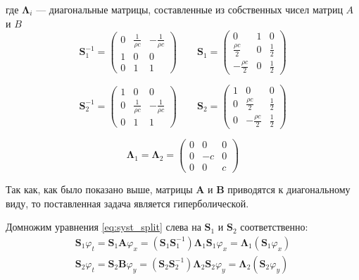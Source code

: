 где  $\pmb{\Lambda}_i$ --- диагональные матрицы, составленные из собственных чисел матриц $A$ и $B$
\begin{equation}
	\pmb{S}_1^{-1} = 
	\begin{pmatrix}
		0 & \frac{1}{\rho c} & -\frac{1}{\rho c} \\
		1 & 0 & 0 \\
		0 & 1 & 1			
    \end{pmatrix} \qquad
	\pmb{S}_1 = 
	\begin{pmatrix}
		0 & 1 & 0 \\
		\frac{\rho c}{2} & 0 & \frac{1}{2} \\
		-\frac{\rho c}{2} & 0 & \frac{1}{2}		
 	 \end{pmatrix}
\end{equation}

\begin{equation}
	\pmb{S}_2^{-1} = 
	\begin{pmatrix}
		1 & 0 & 0 \\
		0 & \frac{1}{\rho c} & -\frac{1}{\rho c} \\
		0 & 1 & 1			
 	\end{pmatrix} \qquad
	\pmb{S}_2 = 
	\begin{pmatrix}
		1 & 0 & 0 \\
		0 & \frac{\rho c}{2} & \frac{1}{2} \\
		0 & -\frac{\rho c}{2} & \frac{1}{2}	
 	\end{pmatrix}
\end{equation}

\begin{equation}
	\pmb{\Lambda}_1 = \pmb{\Lambda}_2 = 
	\begin{pmatrix}
		0 & 0 & 0 \\
		0 & -c & 0 \\
		0 & 0 & c				
	\end{pmatrix}
\end{equation}

Так как, как было показано выше, матрицы $\pmb{A}$ и $\pmb{B}$ приводятся к диагональному виду, то поставленная задача является гиперболической.

Домножим уравнения \eqref{eq:syst_split} слева на $\pmb{S}_1$ и $\pmb{S}_2$ соответственно:
\begin{equation}
\begin{gathered} 
	\pmb{S}_1\varphi_t = 
	\pmb{S}_1 \pmb{A} \varphi_x =
	\left(\pmb{S}_1 \pmb{S}_1^{-1}\right)\pmb{\Lambda}_1 \pmb{S}_1 \varphi_x =
	\pmb{\Lambda}_1 \left(\pmb{S}_1 \varphi_x \right) \\
	\pmb{S}_2\varphi_t = 
	\pmb{S}_2 \pmb{B} \varphi_y = 
	\left(\pmb{S}_2 \pmb{S}_2^{-1}\right)\pmb{\Lambda}_2 \pmb{S}_2 \varphi_y =
	\pmb{\Lambda}_2 \left(\pmb{S}_2 \varphi_y \right)
\end{gathered}
\end{equation}

